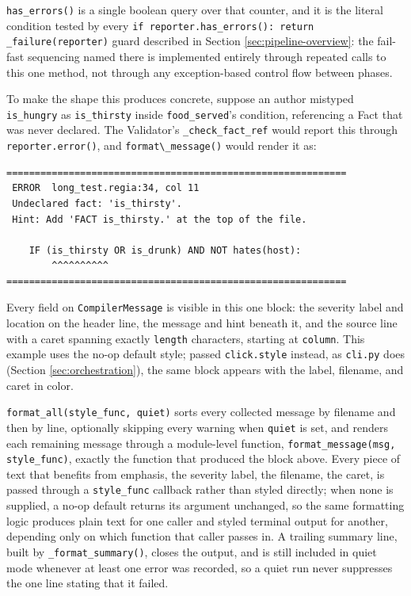 \lstinline|has_errors()| is a single boolean query over that counter, and it is the literal condition tested by every \lstinline|if reporter.has_errors(): return _failure(reporter)| guard described in Section \ref{sec:pipeline-overview}: the fail-fast sequencing named there is implemented entirely through repeated calls to this one method, not through any exception-based control flow between phases.

To make the shape this produces concrete, suppose an author mistyped \lstinline|is_hungry| as \lstinline|is_thirsty| inside \lstinline|food_served|'s condition, referencing a Fact that was never declared. The Validator's \lstinline|_check_fact_ref| would report this through \lstinline|reporter.error()|, and \lstinline|format\_message()| would render it as:
\begin{verbatim}
============================================================
 ERROR  long_test.regia:34, col 11
 Undeclared fact: 'is_thirsty'.
 Hint: Add 'FACT is_thirsty.' at the top of the file.

    IF (is_thirsty OR is_drunk) AND NOT hates(host):
        ^^^^^^^^^^
============================================================
\end{verbatim}
Every field on \lstinline|CompilerMessage| is visible in this one block: the severity label and location on the header line, the message and hint beneath it, and the source line with a caret spanning exactly \lstinline|length| characters, starting at \lstinline|column|. This example uses the no-op default style; passed \lstinline|click.style| instead, as \lstinline|cli.py| does (Section \ref{sec:orchestration}), the same block appears with the label, filename, and caret in color.

\lstinline|format_all(style_func, quiet)| sorts every collected message by filename and then by line, optionally skipping every warning when \lstinline|quiet| is set, and renders each remaining message through a module-level function, \lstinline|format_message(msg, style_func)|, exactly the function that produced the block above. Every piece of text that benefits from emphasis, the severity label, the filename, the caret, is passed through a \lstinline|style_func| callback rather than styled directly; when none is supplied, a no-op default returns its argument unchanged, so the same formatting logic produces plain text for one caller and styled terminal output for another, depending only on which function that caller passes in. A trailing summary line, built by \lstinline|_format_summary()|, closes the output, and is still included in quiet mode whenever at least one error was recorded, so a quiet run never suppresses the one line stating that it failed.

